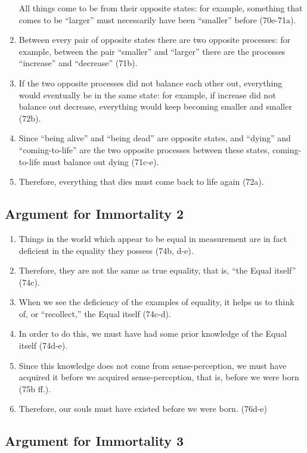 \documentclass[]{article}
\begin{document}
\begin{enumerate}
  All things come to be from their opposite states: for example,
  something that comes to be ``larger'' must necessarily have been
  ``smaller'' before (70e-71a).
\item
  Between every pair of opposite states there are two opposite
  processes: for example, between the pair ``smaller'' and ``larger''
  there are the processes ``increase'' and ``decrease'' (71b).
\item
  If the two opposite processes did not balance each other out,
  everything would eventually be in the same state: for example, if
  increase did not balance out decrease, everything would keep becoming
  smaller and smaller (72b).
\item
  Since ``being alive'' and ``being dead'' are opposite states, and
  ``dying'' and ``coming-to-life'' are the two opposite processes
  between these states, coming-to-life must balance out dying (71c-e).
\item
  Therefore, everything that dies must come back to life again (72a).
\end{enumerate}

\subsection{Argument for Immortality
2}\label{argument-for-immortality-2}

\begin{enumerate}
\def\labelenumi{\arabic{enumi}.}
\item
  Things in the world which appear to be equal in measurement are in
  fact deficient in the equality they possess (74b, d-e).
\item
  Therefore, they are not the same as true equality, that is, ``the
  Equal itself'' (74c).
\item
  When we see the deficiency of the examples of equality, it helps us to
  think of, or ``recollect,'' the Equal itself (74c-d).
\item
  In order to do this, we must have had some prior knowledge of the
  Equal itself (74d-e).
\item
  Since this knowledge does not come from sense-perception, we must have
  acquired it before we acquired sense-perception, that is, before we
  were born (75b ff.).
\item
  Therefore, our souls must have existed before we were born. (76d-e)
\end{enumerate}

\subsection{Argument for Immortality
3}\label{argument-for-immortality-3}
\end{document}
